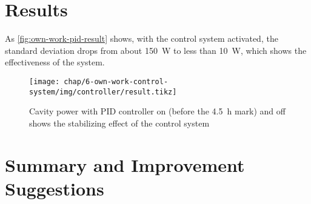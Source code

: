 \FloatBarrier
\newpage
\section{Results}
As \autoref{fig:own-work-pid-result} shows, with the control system activated, the standard deviation drops from about \SI{150}{\watt} to less than \SI{10}{\watt}, which shows the effectiveness of the system.

\begin{figure}[tb]
	\centering
	\texttt{[image: chap/6-own-work-control-system/img/controller/result.tikz]}
	\caption{Cavity power with PID controller on (before the \SI{4.5}{\hour} mark) and off shows the stabilizing effect of the control system}
	\label{fig:own-work-pid-result}
\end{figure}

\FloatBarrier
\section{Summary and Improvement Suggestions}